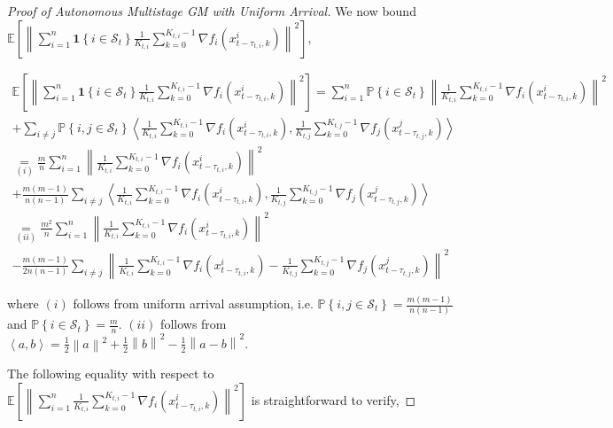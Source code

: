 \begin{proof}[Proof of Autonomous Multistage GM with Uniform Arrival]
We now bound $\mathbb{E}\left[\left\| \sum_{i=1}^n\mathbf{1}\left\{i\in\mathcal{S}_t\right\} \frac{1}{K_{t,i}} \sum_{k=0}^{K_{t,i}-1}  \nabla f_i(x_{t-\tau_{t,i},k}^i) \right\|^2\right] $,

\begin{equation}
\begin{gathered}
\mathbb{E}\left[\left\| \sum_{i=1}^n\mathbf{1}\left\{i\in\mathcal{S}_t\right\} \frac{1}{K_{t,i}} \sum_{k=0}^{K_{t,i}-1} \nabla f_i(x_{t-\tau_{t,i},k}^i) \right\|^2\right]
= \sum_{i=1}^n \mathbb{P}\left\{i\in\mathcal{S}_t\right\} \left\| \frac{1}{K_{t,i}} \sum_{k=0}^{K_{t,i}-1} \nabla f_i(x_{t-\tau_{t,i},k}^i)\right\|^2 \\+ \sum_{i\neq j}\mathbb{P}\left\{i,j\in\mathcal{S}_t\right\}\left\langle \frac{1}{K_{t,i}} \sum_{k=0}^{K_{t,i}-1} \nabla f_i(x_{t-\tau_{t,i},k}^i),\frac{1}{K_{t,j}} \sum_{k=0}^{K_{t,j}-1} \nabla f_j(x_{t-\tau_{t,j},k}^j)\right\rangle\\
\underset{(i)}{=} \frac{m}{n}\sum_{i=1}^n  \left\| \frac{1}{K_{t,i}} \sum_{k=0}^{K_{t,i}-1} \nabla f_i(x_{t-\tau_{t,i},k}^i)\right\|^2\\
+ \frac{m\left(m-1\right)}{n\left(n-1\right)} \sum_{i\neq j} \left\langle \frac{1}{K_{t,i}} \sum_{k=0}^{K_{t,i}-1} \nabla f_i(x_{t-\tau_{t,i},k}^i),\frac{1}{K_{t,j}} \sum_{k=0}^{K_{t,j}-1} \nabla f_j(x_{t-\tau_{t,j},k}^j)\right\rangle\\
\underset{(ii)}{=} \frac{m^2}{n}\sum_{i=1}^n  \left\| \frac{1}{K_{t,i}} \sum_{k=0}^{K_{t,i}-1} \nabla f_i(x_{t-\tau_{t,i},k}^i)\right\|^2 \\
- \frac{m\left(m-1\right)}{2 n\left(n-1\right)} \sum_{i\neq j} \left\| \frac{1}{K_{t,i}} \sum_{k=0}^{K_{t,i}-1} \nabla f_i(x_{t-\tau_{t,i},k}^i) - \frac{1}{K_{t,j}} \sum_{k=0}^{K_{t,j}-1} \nabla f_j(x_{t-\tau_{t,j},k}^j) \right\|^2
\end{gathered}\nonumber
\end{equation}

where $(i)$ follows from uniform arrival assumption, i.e. $\mathbb{P}\left\{i,j\in\mathcal{S}_t\right\}=\frac{m(m-1)}{n(n-1)}$ and $\mathbb{P}\left\{i\in\mathcal{S}_t\right\}=\frac{m}{n}$. $(ii)$ follows from $\left\langle a, b \right\rangle = \frac{1}{2} \left\| a \right\|^2 + \frac{1}{2} \left\| b \right\|^2 - \frac{1}{2} \left\| a - b \right\|^2 $.


The following equality with respect to $\mathbb{E}\left[\left\| \sum_{i=1}^n \frac{1}{K_{t,i}} \sum_{k=0}^{K_{t,i}-1} \nabla f_i(x_{t-\tau_{t,i},k}^i) \right\|^2\right]$ is straightforward to verify,


\end{proof}
